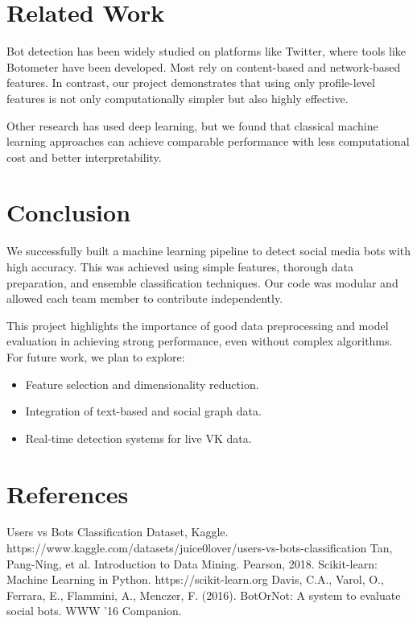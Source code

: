 \documentclass[conference]{IEEEtran}
\begin{document}
\section{Related Work}
Bot detection has been widely studied on platforms like Twitter, where tools like Botometer have been developed. Most rely on content-based and network-based features. In contrast, our project demonstrates that using only profile-level features is not only computationally simpler but also highly effective.

Other research has used deep learning, but we found that classical machine learning approaches can achieve comparable performance with less computational cost and better interpretability.

\section{Conclusion}
We successfully built a machine learning pipeline to detect social media bots with high accuracy. This was achieved using simple features, thorough data preparation, and ensemble classification techniques. Our code was modular and allowed each team member to contribute independently.

This project highlights the importance of good data preprocessing and model evaluation in achieving strong performance, even without complex algorithms. For future work, we plan to explore:
\begin{itemize}
    \item Feature selection and dimensionality reduction.
    \item Integration of text-based and social graph data.
    \item Real-time detection systems for live VK data.
\end{itemize}

\section{References}
\begin{thebibliography}{00}
 Users vs Bots Classification Dataset, Kaggle. https://www.kaggle.com/datasets/juice0lover/users-vs-bots-classification
 Tan, Pang-Ning, et al. Introduction to Data Mining. Pearson, 2018.
 Scikit-learn: Machine Learning in Python. https://scikit-learn.org
 Davis, C.A., Varol, O., Ferrara, E., Flammini, A., Menczer, F. (2016). BotOrNot: A system to evaluate social bots. WWW '16 Companion.
\end{thebibliography}
\end{document}
